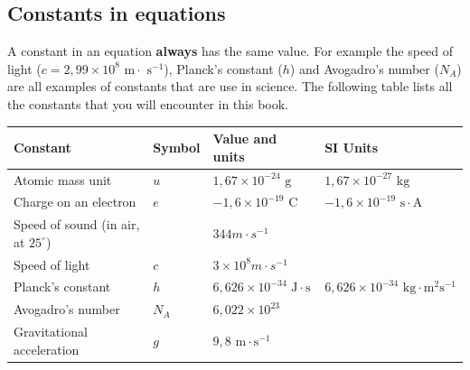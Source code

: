 \subsection*{Constants in equations}
A constant in an equation \textbf{always} has the same value. For example the speed of light ($c = 2,99 \times 10^{8} \text{ m} \cdot \text{ s}^{-1}$), Planck's constant ($h$) and Avogadro's number ($N_A$) are all examples of constants that are use in science. The following table lists all the constants that you will encounter in this book.
\begin{table}[H]
 \begin{center}
  \begin{tabular}{|l|l|l|l|}\hline
   \textbf{Constant} & Symbol & \textbf{Value and units} & \textbf{SI Units} \\ \hline
Atomic mass unit & $u$ & $1,67 \times 10^{-24} \text{ g}$ & $1,67 \times 10^{-27} \text{ kg}$ \\ \hline
Charge on an electron & $e$ & $-1,6 \times 10^{-19} \text{ C}$ & $-1,6 \times 10^{-19} \text{ s}\cdot \text{A}$ \\ \hline
Speed of sound (in air, at $25^{\circ}$) & & \multicolumn{2}{l|}{$344 m \cdot s^{-1}$} \\ \hline
Speed of light & $c$ & \multicolumn{2}{l|}{$3 \times 10^{8} m \cdot s^{-1}$} \\ \hline
Planck's constant & $h$ & $6,626 \times 10^{-34} \text{ J} \cdot \text{s}$ & $6,626 \times 10^{-34} \text{ kg} \cdot \text{m}^{2} \text{s}^{-1}$ \\ \hline
Avogadro's number & $N_{A}$ & \multicolumn{2}{l|}{$6,022 \times 10^{23}$} \\ \hline
Gravitational acceleration & $g$ & \multicolumn{2}{l|}{$9,8 \text{ m} \cdot \text{s}^{-1}$} \\ \hline  
  \end{tabular}
 \end{center}
\end{table}

